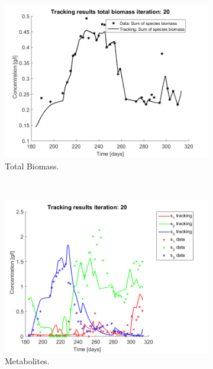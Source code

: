 \documentclass[3p,times]{article}
\begin{document}
\begin{figure}[h]
	\centering
	\begin{subfigure}{0.45 \linewidth}
		\includegraphics[width= \textwidth]{Application/200407_regroup_OTU_try2_iter_20_Biomass}
		\caption{Total Biomass.}
		\label{Total Biomass application}
	\end{subfigure}
	~
	\begin{subfigure}{0.45 \linewidth}
		\includegraphics[width=\textwidth]{Application/200407_regroup_OTU_try2_iter_20_metabolites}
		\caption{Metabolites.}
		\label{Metabolites application}
	\end{subfigure}
	\begin{subfigure}{0.45 \linewidth}

\end{subfigure}
\end{figure}
\end{document}
